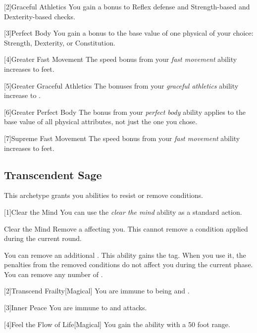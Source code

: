         [2]{Graceful Athletics} You gain a  bonus to Reflex defense and Strength-based and Dexterity-based checks.

        [3]{Perfect Body} You gain a  bonus to the base value of one physical  of your choice: Strength, Dexterity, or Constitution.

        [4]{Greater Fast Movement} The speed bonus from your \textit{fast movement} ability increases to  feet.

        [5]{Greater Graceful Athletics} The bonuses from your \textit{graceful athletics} ability increase to .

        [6]{Greater Perfect Body} The bonus from your \textit{perfect body} ability applies to the base value of all physical attributes, not just the one you chose.

        [7]{Supreme Fast Movement} The speed bonus from your \textit{fast movement} ability increases to  feet.

    \subsection{Transcendent Sage}
        This archetype grants you abilities to resist or remove conditions.

        [1]{Clear the Mind} You can use the \textit{clear the mind} ability as a standard action.
        \begin{freeability}{Clear the Mind}
            Remove a  affecting you.
            This cannot remove a condition applied during the current round.

            \rankline
             You can remove an additional .
             This ability gains the  tag.
            When you use it, the penalties from the removed conditions do not affect you during the current phase.
             You can remove any number of .
        \end{freeability}

        [2]{Transcend Frailty}[Magical]
        You are immune to being  and .

        [3]{Inner Peace} You are immune to  and  attacks.

        [4]{Feel the Flow of Life}[Magical] You gain the  ability with a 50 foot range.

